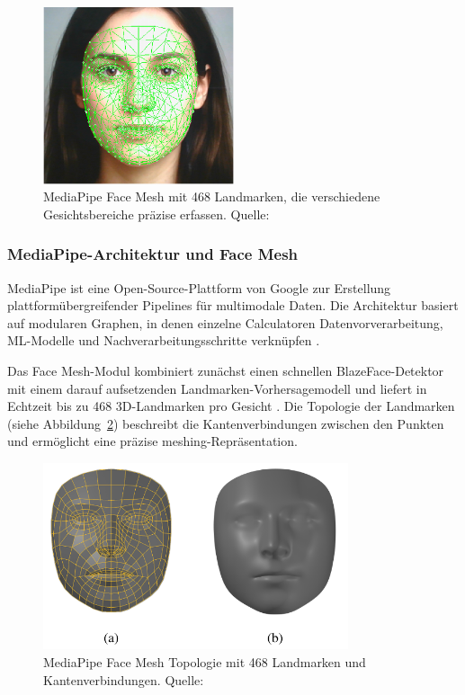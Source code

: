\begin{figure}[htbp]
    \centering
    \includegraphics[width=0.5\textwidth]{data/FaceMesh_Mediapipe.png}
    \caption{MediaPipe Face Mesh mit 468 Landmarken, die verschiedene Gesichtsbereiche präzise erfassen. Quelle: \cite{mediapipe.docs}}
    \label{fig:mediapipe_face_mesh}
\end{figure}

\subsubsection{MediaPipe-Architektur und Face Mesh}
MediaPipe ist eine Open-Source-Plattform von Google zur Erstellung plattformübergreifender Pipelines für multimodale Daten. Die Architektur basiert auf modularen Graphen, in denen einzelne Calculatoren Datenvorverarbeitung, ML-Modelle und Nachverarbeitungsschritte verknüpfen \cite{mediapipe_solutions_guide}.

Das Face Mesh-Modul kombiniert zunächst einen schnellen BlazeFace-Detektor mit einem darauf aufsetzenden Landmarken-Vorhersagemodell und liefert in Echtzeit bis zu 468 3D-Landmarken pro Gesicht \cite{mediapipe.docs}. Die Topologie der Landmarken (siehe Abbildung~\ref{fig:mesh_topology}) beschreibt die Kantenverbindungen zwischen den Punkten und ermöglicht eine präzise meshing-Repräsentation.

\begin{figure}[htbp]
    \centering
    \includegraphics[width=0.8\textwidth]{data/mesh_topology.png}
    \caption{MediaPipe Face Mesh Topologie mit 468 Landmarken und Kantenverbindungen. Quelle: \cite{mediapipe_mesh_topology}}
    \label{fig:mesh_topology}
\end{figure}

